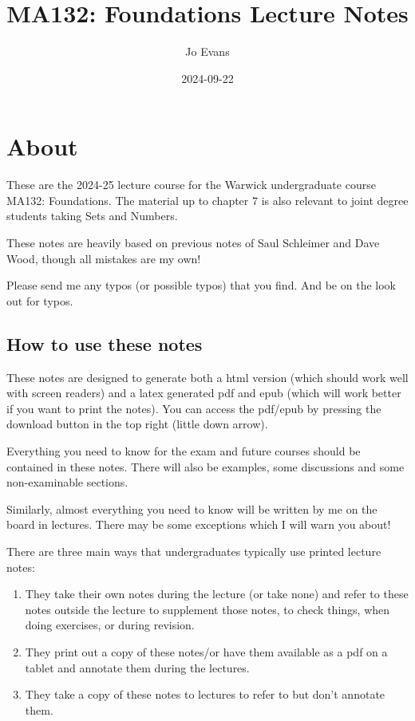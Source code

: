 \documentclass[
]{book}
\title{MA132: Foundations Lecture Notes}
\author{Jo Evans}
\date{2024-09-22}
\theoremstyle{definition}
\theoremstyle{definition}
\theoremstyle{definition}
\theoremstyle{definition}
\theoremstyle{remark}
\begin{document}
\maketitle

{
\setcounter{tocdepth}{1}
\tableofcontents
}
\chapter{About}\label{about}

These are the 2024-25 lecture course for the Warwick undergraduate course MA132: Foundations. The material up to chapter 7 is also relevant to joint degree students taking Sets and Numbers.

These notes are heavily based on previous notes of Saul Schleimer and Dave Wood, though all mistakes are my own!

Please send me any typos (or possible typos) that you find. And be on the look out for typos.

\section{How to use these notes}\label{how-to-use-these-notes}

These notes are designed to generate both a html version (which should work well with screen readers) and a latex generated pdf and epub (which will work better if you want to print the notes). You can access the pdf/epub by pressing the download button in the top right (little down arrow).

Everything you need to know for the exam and future courses should be contained in these notes. There will also be examples, some discussions and some non-examinable sections.

Similarly, almost everything you need to know will be written by me on the board in lectures. There may be some exceptions which I will warn you about!

There are three main ways that undergraduates typically use printed lecture notes:

\begin{enumerate}
\def\labelenumi{\arabic{enumi}.}
\item
  They take their own notes during the lecture (or take none) and refer to these notes outside the lecture to supplement those notes, to check things, when doing exercises, or during revision.
\item
  They print out a copy of these notes/or have them available as a pdf on a tablet and annotate them during the lectures.
\item
  They take a copy of these notes to lectures to refer to but don't annotate them.
\end{enumerate}
\end{document}
